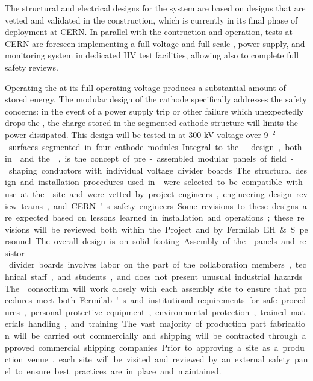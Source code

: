 The structural and electrical designs for the  \hv system are based on designs that are vetted and validated in the  construction, which is currently in its final phase of deployment at CERN. In parallel with the  contruction and operation,   tests at CERN are foreseen implementing a full-voltage and full-scale  \fdth, power supply, and monitoring system in dedicated HV test facilities, allowing also to complete full safety reviews. 

Operating the \fc at its full operating voltage produces a substantial amount of stored energy. The modular design of the cathode specifically addresses the safety concerns: in the event of a power supply trip or other failure which unexpectedly drops the \hv, the charge stored in the segmented cathode structure  will limits the power dissipated. 
This design will be  tested in  at 300 kV voltage over \SI{9}{\m$^2$} surfaces segmented in four cathode modules.  

Integral to the  \fc design, both in  and the \dpmod, is the concept of pre-assembled modular panels of field-shaping conductors with individual voltage divider boards. The structural design and installation procedures used in  were selected to be compatible with use at the  site and were vetted by project engineers, engineering design review teams, and CERN's safety engineers. Some revisions to these designs are expected based on lessons learned in installation and operations; these revisions will be reviewed both within the Project and by Fermilab EH\&S personnel. The overall design is on solid footing. 

Assembly of the \fc panels and resistor-divider boards involves labor on the part of the collaboration members, technical staff, and students, and  does not present unusual industrial hazards. The  consortium will work closely with each assembly site to ensure that procedures meet both Fermilab's and institutional requirements for safe procedures, personal protective equipment, environmental protection, trained materials handling, and training. The vast majority of production part fabrication will be carried out commercially and shipping will be contracted through approved commercial shipping companies. Prior to approving a site as a production venue, each site will be visited and reviewed by an external safety panel to ensure best practices are in place and maintained. 

